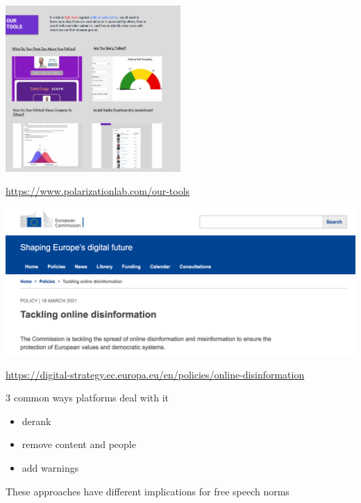 \documentclass[aspectratio=169]{beamer}
\begin{document}
\begin{frame}

\begin{center}
\includegraphics[width=0.5\textwidth]{figures/polarization_lab_our_tools}
\end{center}

\vfill
\url{https://www.polarizationlab.com/our-tools}

\end{frame}
\begin{frame}

\begin{center}
\includegraphics[width=\textwidth]{figures/eu_misinformation}
\end{center}

\url{https://digital-strategy.ec.europa.eu/en/policies/online-disinformation}

\end{frame}
\begin{frame}

3 common ways platforms deal with it
\begin{itemize}
\item derank \pause
\item remove content and people \pause
\item add warnings  \pause
\end{itemize}

\vfill
These approaches have different implications for free speech norms

\end{frame}
\end{document}
